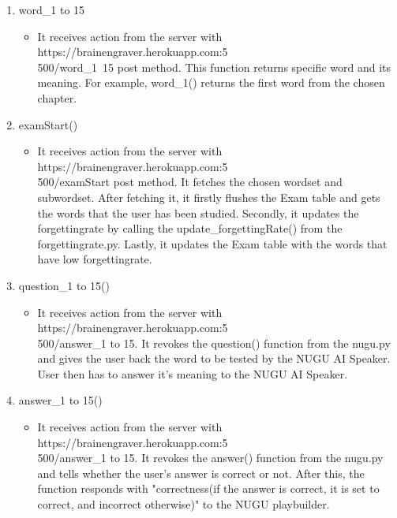 \documentclass[conference]{IEEEtran}
\begin{document}
\begin{enumerate}
\begin{enumerate}
\begin{enumerate}
\begin{enumerate}
\begin{itemize}
                                    \end{itemize}
                                \item word\_1 to 15
                                    \begin{itemize}
                                        \item It receives action from the server with https://brainengraver.herokuapp.com:5\\500/word\_1~15 post method. This function returns specific word and its meaning. For example, word\_1() returns the first word from the chosen chapter.
                                    \end{itemize}
                                \item examStart()
                                    \begin{itemize}
                                        \item It receives action from the server with https://brainengraver.herokuapp.com:5\\500/examStart post method. It fetches the chosen wordset and subwordset. After fetching it, it firstly flushes the Exam table and gets the words that the user has been studied. Secondly, it updates the forgettingrate by calling the update\_forgettingRate() from the forgettingrate.py. Lastly, it updates the Exam table with the words that have low forgettingrate.
                                    \end{itemize}
                                \item question\_1 to 15()
                                    \begin{itemize}
                                        \item It receives action from the server with https://brainengraver.herokuapp.com:5\\500/answer\_1 to
                                        15. It revokes the question() function from the nugu.py and gives the user back the word to be tested by the NUGU AI Speaker. User then has to answer it's meaning to the NUGU AI Speaker.
                                    \end{itemize}
                                \item answer\_1 to 15()
                                    \begin{itemize}
                                        \item It receives action from the server with https://brainengraver.herokuapp.com:5\\500/answer\_1 to 15. It revokes the answer() function from the nugu.py and tells whether the user's answer is correct or not. After this, the function responds with "correctness(if the answer is correct, it is set to correct, and incorrect otherwise)" to the NUGU playbuilder.

\end{itemize}
\end{enumerate}
\end{enumerate}
\end{enumerate}
\end{enumerate}
\end{document}
